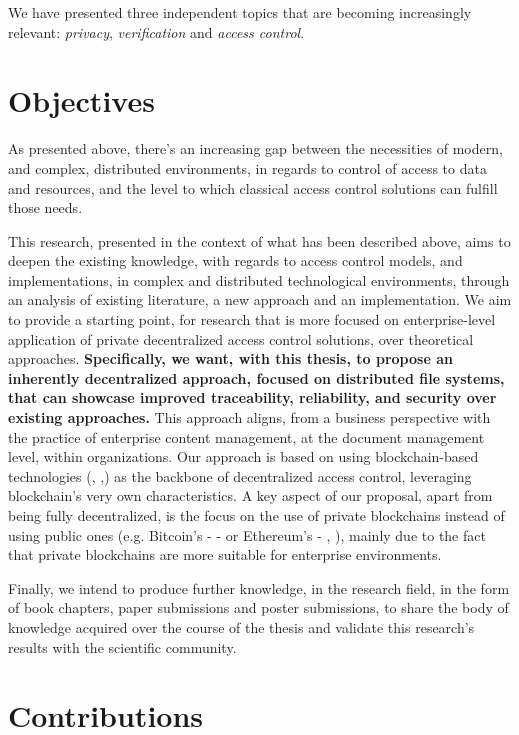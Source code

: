 We have presented three independent topics that are becoming increasingly relevant: \textit{privacy}, \textit{verification} and \textit{access control}.

\section{Objectives}

As presented above, there's an increasing gap between the necessities of modern, and complex, distributed environments, in regards to control of access to data and resources, and the level to which classical access control solutions can fulfill those needs.

This research, presented in the context of what has been described above, aims to deepen the existing knowledge, with regards to access control models, and implementations, in complex and distributed technological environments, through an analysis of existing literature, a new approach and an implementation. We aim to provide a starting point, for research that is more focused on enterprise-level application of private decentralized access control solutions, over theoretical approaches. \textbf{Specifically, we want, with this thesis, to propose an inherently decentralized approach, focused on distributed file systems, that can showcase improved traceability, reliability, and security over existing approaches.} This approach aligns, from a business perspective with the practice of enterprise content management, at the document management level, within organizations. Our approach is based on using blockchain-based technologies (\cite{nakamoto_bitcoin:_2008}, \cite{buterin_next-generation_2013},\cite{wood_ethereum:_2014}) as the backbone of decentralized access control, leveraging blockchain's very own characteristics. A key aspect of our proposal, apart from being fully decentralized, is the focus on the use of private blockchains instead of using public ones (e.g. Bitcoin's - \cite{nakamoto_bitcoin:_2008} - or Ethereum's - \cite{buterin_next-generation_2013}, \cite{wood_ethereum:_2014}), mainly due to the fact that private blockchains are more suitable for enterprise environments.

Finally, we intend to produce further knowledge, in the research field, in the form of book chapters, paper submissions and poster submissions, to share the body of knowledge acquired over the course of the thesis and validate this research's results with the scientific community.

\section{Contributions}
\label{sec:contributions}

